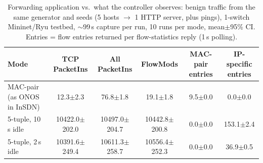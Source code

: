 \begin{table}[t]
\caption{Forwarding application vs.\ what the controller observes: benign traffic from the same generator and seeds (5 hosts $\rightarrow$ 1 HTTP server, plus pings), 1-switch Mininet/Ryu testbed, $\sim$99\,s capture per run, 10 runs per mode, mean{\scriptsize$\pm$}95\% CI. Entries = flow entries returned per flow-statistics reply (1\,s polling). }
\label{tab:live}
\centering\small
\begin{tabular}{lccccc}
\toprule
Mode & TCP PacketIns & All PacketIns & FlowMods & MAC-pair entries & IP-specific entries \\
\midrule
MAC-pair (as ONOS in InSDN) & 12.3{\scriptsize$\pm$2.3} & 76.8{\scriptsize$\pm$1.8} & 19.1{\scriptsize$\pm$1.8} & 9.5{\scriptsize$\pm$0.0} & 0.0{\scriptsize$\pm$0.0} \\
5-tuple, 10\,s idle & 10422.0{\scriptsize$\pm$202.0} & 10497.0{\scriptsize$\pm$204.7} & 10442.8{\scriptsize$\pm$200.8} & 0.0{\scriptsize$\pm$0.0} & 153.1{\scriptsize$\pm$2.4} \\
5-tuple, 2\,s idle & 10391.6{\scriptsize$\pm$249.4} & 10611.3{\scriptsize$\pm$258.7} & 10556.4{\scriptsize$\pm$252.3} & 0.0{\scriptsize$\pm$0.0} & 36.9{\scriptsize$\pm$0.5} \\
\bottomrule
\end{tabular}
\end{table}
